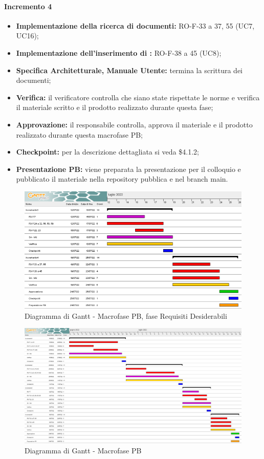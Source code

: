 \paragraph{Incremento 4}
\begin{itemize}
    \item \textbf{Implementazione della ricerca di documenti:} RO-F-33 a 37, 55 (UC7, UC16);
    \item \textbf{Implementazione dell'inserimento di :} RO-F-38 a 45 (UC8);
    \item \textbf{Specifica Architetturale, Manuale Utente:} termina la scrittura dei documenti;
    \item \textbf{Verifica:} il verificatore controlla che siano state rispettate le norme e verifica il materiale scritto e il prodotto realizzato durante questa fase;
    \item \textbf{Approvazione:} il responsabile controlla, approva il materiale e il prodotto realizzato durante questa macrofase PB;
    \item \textbf{Checkpoint:} per la descrizione dettagliata si veda \$4.1.2;
    \item \textbf{Presentazione PB:} viene preparata la presentazione per il colloquio e pubblicato il materiale nella repository pubblica e nel branch main.
\end{itemize}

\begin{landscape}
	\begin{figure}
	\includegraphics[width=\linewidth]{images/PB_desiderabili.png}
    \caption{Diagramma di Gantt - Macrofase PB, fase Requisiti Desiderabili}
	\end{figure}
\end{landscape}

\begin{landscape}
	\begin{figure}
	\includegraphics[width=\linewidth]{images/PB.png}
    \caption{Diagramma di Gantt - Macrofase PB}
	\end{figure}
\end{landscape}

\newpage